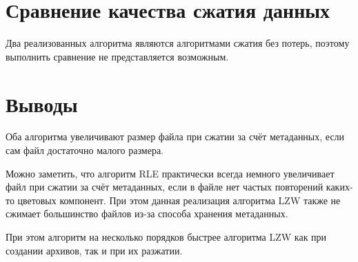 \documentclass[a4paper,oneside]{article}
\theoremstyle{definition}
\begin{document}
\section{Сравнение качества сжатия данных}

Два реализованных алгоритма являются алгоритмами сжатия без потерь, поэтому
выполнить сравнение не представляется возможным.

\section{Выводы}

Оба алгоритма увеличивают размер файла при сжатии за счёт метаданных, если сам
файл достаточно малого размера.

Можно заметить, что алгоритм RLE практически всегда немного увеличивает файл
при сжатии за счёт метаданных, если в файле нет частых повторений каких-то
цветовых компонент. При этом данная реализация алгоритма LZW также не
сжимает большинство файлов из-за способа хранения метаданных.

При этом алгоритм на несколько порядков быстрее алгоритма LZW как при создании
архивов, так и при их разжатии.
\end{document}
